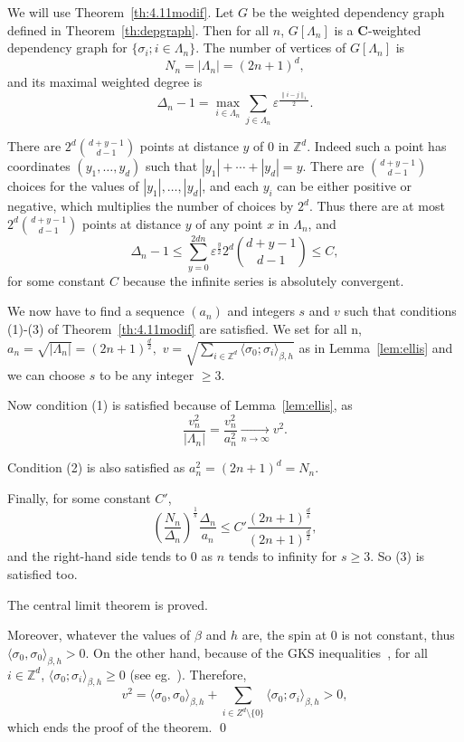 \documentclass{amsart}
\newcommand{\field}[1]{\mathbb{#1}}
\newcommand{\Z}{\field{Z}}
\def\WDep{G}
\def\eps{\varepsilon}
\newcommand{\dist}[2]{\|#1 - #2\|_1}
\numberwithin{equation}{section}
\theoremstyle{remark}
\renewenvironment{proof}[1][Proof]{\begin{trivlist}
\item[\hskip \labelsep {\bfseries #1:}]}{\qed\end{trivlist}}
\begin{document}
\begin{proof}[Proof of Theorem~\ref{th:cltmagnet}]
We will use Theorem~\ref{th:4.11modif}.
Let $\WDep$ be the weighted dependency graph defined in Theorem~\ref{th:depgraph}. Then for all $n$, $\WDep[\Lambda_n]$ is a $\mathbf{C}$-weighted dependency graph for $\{\sigma_i; i \in \Lambda_n\}$.
The number of vertices of $\WDep[\Lambda_n]$ is
$$N_n = \left| \Lambda_n \right| = (2n+1)^d,$$
and its maximal weighted degree is
$$\Delta_n -1 = \max_{i \in \Lambda_n} \sum_{j \in \Lambda_n} \eps^{\frac{\dist{i}{j}}{2}}.$$

There are $2^d {d+y-1 \choose d-1}$ points at distance $y$ of $0$ in $\Z^d$. Indeed such a point has coordinates $(y_1, \dots, y_d)$ such that $|y_1| + \cdots + |y_d|=y.$ There are ${d+y-1 \choose d-1}$ choices for the values of $|y_1|, \dots, |y_d|$, and each $y_i$ can be either positive or negative, which multiplies the number of choices by $2^d.$
Thus there are at most $2^d {d+y-1 \choose d-1}$ points at distance $y$ of any point $x$ in $\Lambda_n$, and
\[
\Delta_n -1 \leq \sum_{y=0}^{2dn} \eps^{\frac{y}{2}} 2^d {d+y-1 \choose d-1}
 \leq C,
 \]
for some constant $C$ because the infinite series is absolutely convergent.

We now have to find a sequence $(a_n)$ and integers $s$ and $v$ such that conditions (1)-(3) of Theorem~\ref{th:4.11modif} are satisfied.
We set for all n, $a_n= \sqrt{|\Lambda_n|}=(2n+1)^{\frac{d}{2}},$ $v= \sqrt{ \sum_{i \in \Z^d} \langle\sigma_0;\sigma_i\rangle_{\beta,h}}$ as in Lemma~\ref{lem:ellis} and we can choose $s$ to be any integer $\geq 3$.

Now condition (1) is satisfied because of Lemma~\ref{lem:ellis}, as
$$ \frac{v_n^{2}}{|\Lambda_n|} = \frac{v_n^{2}}{a_n^2} \xrightarrow[n \to\infty]{} v^{2}.$$

Condition (2) is also satisfied as $a_n^2 = (2n+1)^d = N_n$.

Finally, for some constant $C'$,
$$\left( \frac{N_n}{\Delta_n} \right) ^{\frac{1}{s}} \frac{\Delta_n}{a_n} \leq C' \frac{(2n+1)^{\frac{d}{s}}}{(2n+1)^{\frac{d}{2}}},$$
and the right-hand side tends to $0$ as $n$ tends to infinity for $s \geq 3$. So (3) is satisfied too.

The central limit theorem is proved.

Moreover, whatever the values of $\beta$ and $h$ are, the spin at $0$ is not constant,
thus $\langle \sigma_0,\sigma_0 \rangle_{\beta,h} >0$. On the other hand, because of the GKS inequalities~\cite{Griffiths,KS},
for all $i \in \Z^d$,  $\langle\sigma_0;\sigma_i\rangle_{\beta,h} \geq 0$ (see eg.~\cite{Velenik}). Therefore,
$$v^{2} = \langle\sigma_0,\sigma_0\rangle_{\beta,h} + \sum_{i \in Z^d \setminus \{0\} } \langle\sigma_0;\sigma_i\rangle_{\beta,h} > 0,$$
which ends the proof of the theorem.
\end{proof}
\end{document}

